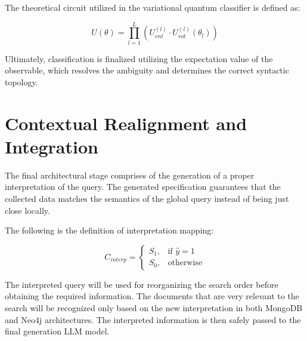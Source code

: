 The theoretical circuit utilized in the variational quantum classifier is defined as:

\begin{equation}
	U(\theta) = \prod_{l=1}^{L} \left(U_{ent}^{(l)} \cdot U_{rot}^{(l)}(\theta_l)\right)
\end{equation}

Ultimately, classification is finalized utilizing the expectation value of the observable, which resolves the ambiguity and determines the correct syntactic topology.

\section{Contextual Realignment and Integration}

The final architectural stage comprises of the generation of a proper interpretation of the query. The generated specification guarantees that the collected data matches the semantics of the global query instead of being just close locally.

The following is the definition of interpretation mapping:

\begin{equation}
	C_{interp} =
	\begin{cases}
		S_1, & \text{if } \hat{y} = 1 \\
		S_0, & \text{otherwise}
	\end{cases}
\end{equation}

The interpreted query will be used for reorganizing the search order before obtaining the required information. The documents that are very relevant to the search will be recognized only based on the new interpretation in both MongoDB and Neo4j architectures. The interpreted information is then safely passed to the final generation LLM model.